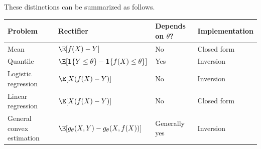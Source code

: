 These distinctions can be summarized as follows.

\begin{center}
\begin{tabular}{llll}
\toprule
Problem
& Rectifier
& Depends on $\theta$?
& Implementation
\\
\midrule
Mean
& $\E[f(X)-Y]$
& No
& Closed form
\\

Quantile
&
$\E[
\mathbf{1}\{Y\leq\theta\}
-
\mathbf{1}\{f(X)\leq\theta\}
]$
& Yes
& Inversion
\\

Logistic regression
&
$\E[X(f(X)-Y)]$
& No
& Inversion
\\

Linear regression
&
$\E[X(f(X)-Y)]$
& No
& Closed form
\\

General convex estimation
&
$\E[
g_\theta(X,Y)
-
g_\theta(X,f(X))
]$
& Generally yes
& Inversion
\\
\bottomrule
\end{tabular}
\end{center}